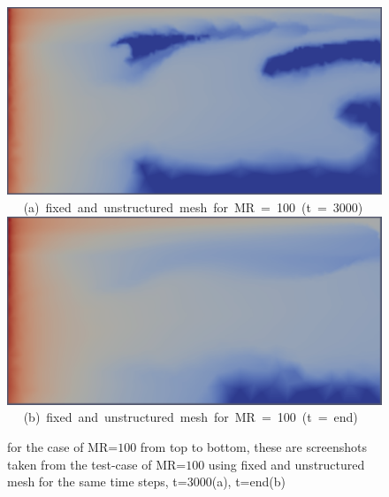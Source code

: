\begin{landscape}
\begin{figure}[ht] 
\vbox{
\hbox{\hspace{3.5cm}
\includegraphics[width=.8\textwidth]{./Pics1/mr100_fixed/mr100_fixed_3000.pdf} 
}
\vspace{0.0cm}
\hbox{\hspace{3.75cm} (a) fixed and unstructured mesh for MR = 100 (t = 3000)   
}
\hbox{\hspace{3.5cm}
\includegraphics[width=.8\textwidth]{./Pics1/mr100_fixed/mr100_fixed_end.pdf}
}
\vspace{0.0cm}
\hbox{\hspace{3.75cm} (b) fixed and unstructured mesh for MR = 100 (t = end)   
}
}     
\caption{for the case of MR=$100$ from top to bottom, these are screenshots taken from the test-case of MR=$100$ using fixed and unstructured mesh for the same time steps, t=3000(a), t=end(b) }
\label{fig:4testcase_b}
\end{figure}
\end{landscape}
\clearpage


